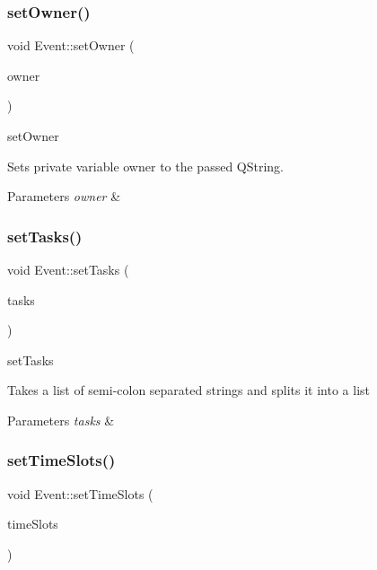 \subsubsection{\texorpdfstring{set\+Owner()}{setOwner()}}
{\footnotesize\ttfamily void Event\+::set\+Owner (\begin{DoxyParamCaption}\item[{Q\+String}]{owner }\end{DoxyParamCaption})}



set\+Owner 

Sets private variable owner to the passed Q\+String. 
\begin{DoxyParams}{Parameters}
{\em owner} & \\
\hline
\end{DoxyParams}
\mbox{\label{class_event_a23cb6c79d76f416edcbdc2044fa73138}} 
\subsubsection{\texorpdfstring{set\+Tasks()}{setTasks()}}
{\footnotesize\ttfamily void Event\+::set\+Tasks (\begin{DoxyParamCaption}\item[{Q\+String}]{tasks }\end{DoxyParamCaption})}



set\+Tasks 

Takes a list of semi-\/colon separated strings and splits it into a list 
\begin{DoxyParams}{Parameters}
{\em tasks} & \\
\hline
\end{DoxyParams}
\mbox{\label{class_event_ad39ee28106d13c32165cb091a500f896}} 
\subsubsection{\texorpdfstring{set\+Time\+Slots()}{setTimeSlots()}}
{\footnotesize\ttfamily void Event\+::set\+Time\+Slots (\begin{DoxyParamCaption}\item[{Q\+List$<$ int $>$}]{time\+Slots }\end{DoxyParamCaption})}



